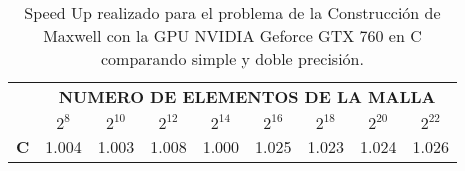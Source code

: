 \begin{table}[h!]
\centering
    \begin{tabular}{|c|c|c|c|c|c|c|c|c|}
    \hline
    \multirow{2}{*}{} & \multicolumn{8}{c|}{\textbf{NUMERO DE ELEMENTOS DE LA MALLA}} \\ \cline{2-9} 
                      & $2^{8}$ & $2^{10}$& $2^{12}$& $2^{14}$& $2^{16}$& $2^{18}$& $2^{20}$& $2^{22}$\\ \hline
    \textbf{C}        &1.004  &1.003  &1.008  &1.000  &1.025  &1.023  &1.024  &1.026  \\ \hline
    \end{tabular}
    \caption{Speed Up realizado para el problema de la Construcción de Maxwell con la GPU NVIDIA Geforce GTX 760 en C comparando simple y doble precisión.}
    \label{tab:c_760_MxC_c_10}
    \end{table}

    
